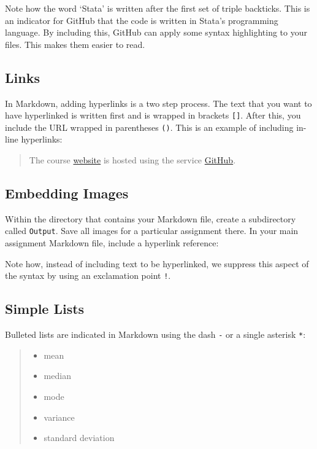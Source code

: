 \documentclass[]{book}
\providecommand{\tightlist}{%
  \setlength{\itemsep}{0pt}\setlength{\parskip}{0pt}}
\begin{document}
Note how the word `Stata' is written after the first set of triple
backticks. This is an indicator for GitHub that the code is written in
Stata's programming language. By including this, GitHub can apply some
syntax highlighting to your files. This makes them easier to read.

\subsection{Links}\label{links}

In Markdown, adding hyperlinks is a two step process. The text that you
want to have hyperlinked is written first and is wrapped in brackets
\texttt{{[}{]}}. After this, you include the URL wrapped in parentheses
\texttt{()}. This is an example of including in-line hyperlinks:

\begin{quote}
The course \href{https://github.com/slu-soc5050}{website} is hosted
using the service \href{https://github.com}{GitHub}.
\end{quote}

\subsection{Embedding Images}\label{embedding-images}

Within the directory that contains your Markdown file, create a
subdirectory called \texttt{Output}. Save all images for a particular
assignment there. In your main assignment Markdown file, include a
hyperlink reference:

Note how, instead of including text to be hyperlinked, we suppress this
aspect of the syntax by using an exclamation point \texttt{!}.

\subsection{Simple Lists}\label{simple-lists}

Bulleted lists are indicated in Markdown using the dash \texttt{-} or a
single asterisk \texttt{*}:

\begin{quote}
\begin{itemize}
\tightlist
\item
  mean
\item
  median
\item
  mode
\item
  variance
\item
  standard deviation
\end{itemize}
\end{quote}
\end{document}
